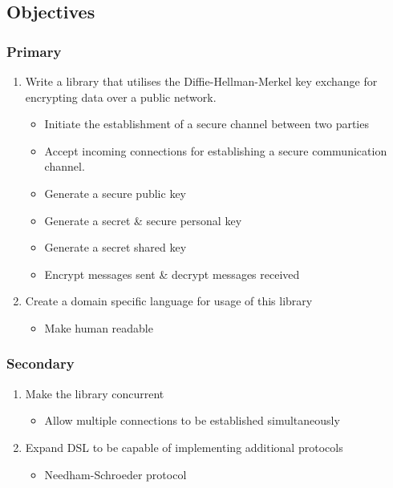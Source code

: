 \iffalse

More background
Objectives
Why we need network protocols
Motivation
Explain DiffieHellman
\fi


\subsection{Objectives}
\label{sec:objectives}
\subsubsection{Primary}
\begin{enumerate}
    \item Write a library that utilises the Diffie-Hellman-Merkel key exchange for encrypting data 
over a public network.
        \begin{itemize}
            \item Initiate the establishment of a secure channel between two parties 
            \item Accept incoming connections for establishing a secure communication channel. 
            \item Generate a secure public key 
            \item Generate a secret \& secure personal key 
            \item Generate a secret shared key 
            \item Encrypt messages sent \& decrypt messages received
        \end{itemize}
    \item Create a domain specific language for usage of this library
        \begin{itemize}
            \item Make human readable
        \end{itemize}
\end{enumerate}
\subsubsection{Secondary}
\begin{enumerate}
    \item Make the library concurrent
        \begin{itemize}
            \item Allow multiple connections to be established simultaneously
        \end{itemize}
    \item Expand DSL to be capable of implementing additional protocols
        \begin{itemize}
            \item Needham-Schroeder protocol 
        \end{itemize}
\end{enumerate}

